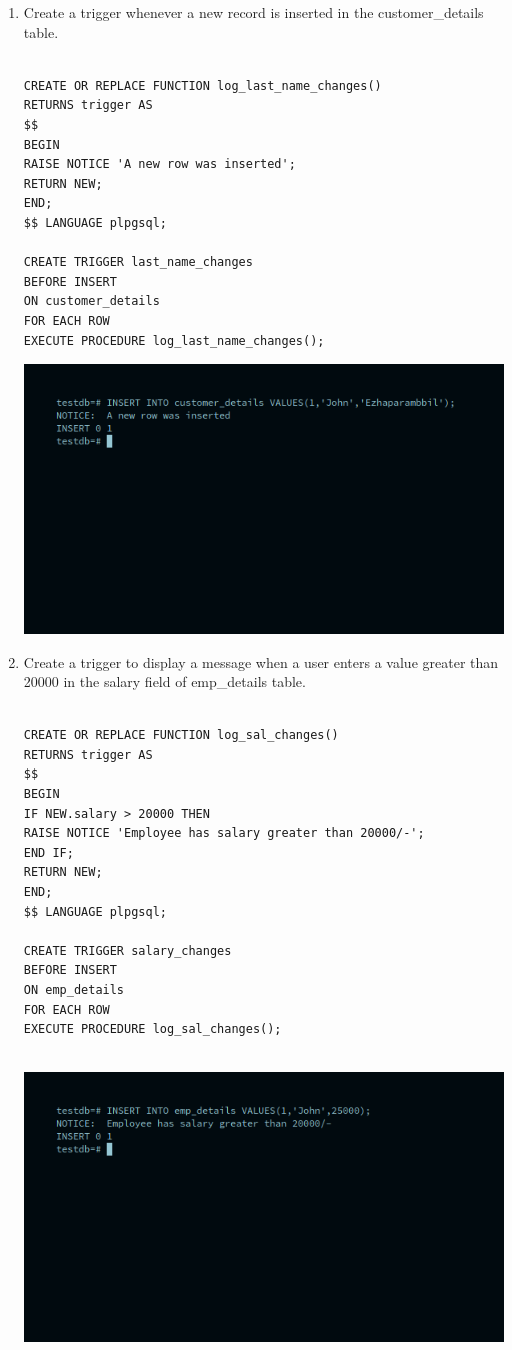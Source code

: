 \begin{enumerate}
\item Create a trigger whenever a new record is inserted in the customer\_details table.
\begin{verbatim}

CREATE OR REPLACE FUNCTION log_last_name_changes()
RETURNS trigger AS
$$
BEGIN
RAISE NOTICE 'A new row was inserted';
RETURN NEW;
END;
$$ LANGUAGE plpgsql;

CREATE TRIGGER last_name_changes
BEFORE INSERT
ON customer_details
FOR EACH ROW
EXECUTE PROCEDURE log_last_name_changes();
\end{verbatim}

\newline
\includegraphics[width=\linewidth]{../Images/Triggers/1.png}

\item Create a trigger to display a message when a user enters a value greater than 20000 in the salary field of emp\_details table.
\begin{verbatim}

CREATE OR REPLACE FUNCTION log_sal_changes()
RETURNS trigger AS
$$
BEGIN
IF NEW.salary > 20000 THEN
RAISE NOTICE 'Employee has salary greater than 20000/-';
END IF;
RETURN NEW;
END;
$$ LANGUAGE plpgsql;

CREATE TRIGGER salary_changes
BEFORE INSERT
ON emp_details
FOR EACH ROW
EXECUTE PROCEDURE log_sal_changes();


\end{verbatim}

\newline
\includegraphics[width=\linewidth]{../Images/Triggers/2.png}


\end{enumerate}
